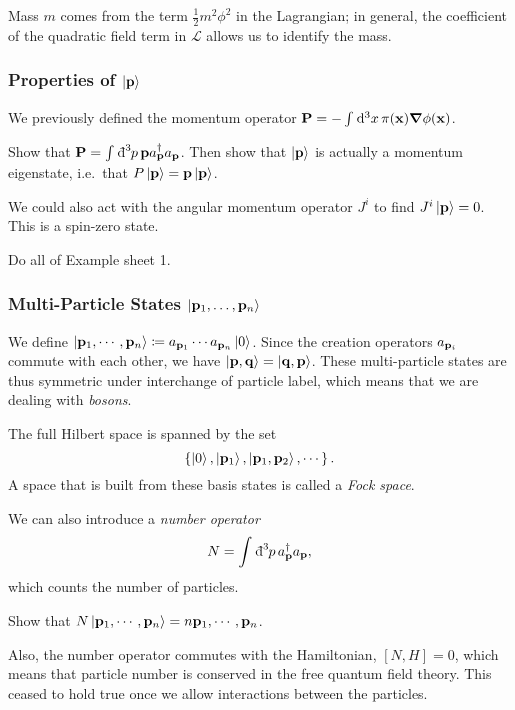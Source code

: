 \begin{leftbar}
  \begin{remark}
    Mass $m$ comes from the term $\frac{1}{2} m^2 \phi^2$ in the Lagrangian; in general, the coefficient of the quadratic field term in $\mathcal{L}$ allows us to identify the mass.
  \end{remark}
\end{leftbar}

\subsubsection{Properties of $\ket{\vb{p}}$}%
\label{subsub:properties_of_p_m_}

We previously defined the momentum operator $\vb{P} = -\int_{}^{} \dd[3]{x} \pi(\vb{x}) \grad \phi(\vb{x})$.
\begin{exercise}
  Show that $\vb{P} = \int_{}^{} \bdd[3]{p} \vb{p} a_{\vb{p}}^{\dagger} a_{\vb{p}}$. Then show that $\ket{\vb{p}}$ is actually a momentum eigenstate, i.e.~that $P \ket{\vb{p}} = \vb{p} \ket{\vb{p}}$.
\end{exercise}
We could also act with the angular momentum operator $J^i$ to find $J^i \ket{\vb{p}} = 0$. This is a spin-zero state.
\begin{exercise}
  Do all of Example sheet 1.
\end{exercise}

\subsubsection{Multi-Particle States $\ket{\vb{p}_1, \ldots, \vb{p}_n}$}%
\label{subsub:multi_particle_states}

We define $\ket{\vb{p}_1, \cdots, \vb{p}_n} \coloneq a_{\vb{p}_1} \cdots a_{\vb{p}_n} \ket{0}$.
Since the creation operators $a_{\vb{p}_i}$ commute with each other, we have $\ket{\vb{p}, \vb{q}} = \ket{\vb{q}, \vb{p}}$. These multi-particle states are thus symmetric under interchange of particle label, which means that we are dealing with \emph{bosons}.

The full Hilbert space is spanned by the set
\begin{equation}
  \left\{ \ket{0}, \ket{\vb{p}_1}, \ket{\vb{p}_1, \vb{p}_2}, \cdots \right\}.
\end{equation}
A space that is built from these basis states is called a \emph{Fock space}.

We can also introduce a \emph{number operator}
\begin{equation}
  N = \int_{}^{} \bdd[3]{p} a_{\vb{p}}^{\dagger} a_{\vb{p}},
\end{equation}
which counts the number of particles.
\begin{exercise}
  Show that $N \ket{\vb{p}_1, \cdots, \vb{p}_{n}} = n{\vb{p}_1, \cdots, \vb{p}_{n}}$.
\end{exercise}
Also, the number operator commutes with the Hamiltonian, $[N, H] = 0$, which means that particle number is conserved in the free quantum field theory. This ceased to hold true once we allow interactions between the particles.
